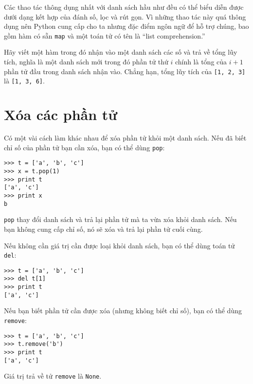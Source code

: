 \documentclass[11pt]{book}
\begin{document}
Các thao tác thông dụng nhất với danh sách hầu như đều có thể 
biểu diễn được dưới dạng kết hợp của đánh số, lọc và rút gọn. 
Vì những thao tác này quá thông dụng nên Python cung cấp cho ta
nhưng đặc điểm ngôn ngữ để hỗ trợ chúng, bao gồm hàm có sẵn 
{\tt map} và một toán tử có tên là ``list comprehension.''


\begin{ex}
\label{cumulative}

Hãy viết một hàm trong đó nhận vào một danh sách các số và trả về
tổng lũy tích, nghĩa là một danh sách mới trong đó phần tử thứ $i$
chính là tổng của $i+1$ phần tử đầu trong danh sách nhận vào.
Chẳng hạn, tổng lũy tích của {\tt [1, 2, 3]} là
{\tt [1, 3, 6]}. 
\end{ex}


\section{Xóa các phần tử}


Có một vài cách làm khác nhau để xóa phần tử khỏi một danh sách.
Nếu đã biết chỉ số của phần tử bạn cần xóa, bạn có thể dùng 
{\tt pop}:


\beforeverb
\begin{verbatim}
>>> t = ['a', 'b', 'c']
>>> x = t.pop(1)
>>> print t
['a', 'c']
>>> print x
b
\end{verbatim}
\afterverb
%
{\tt pop} thay đổi danh sách và trả lại phần tử mà ta vừa xóa 
khỏi danh sách.
Nếu bạn không cung cấp chỉ số, nó sẽ xóa và trả lại phần tử
cuối cùng.

Nếu không cần giá trị cần được loại khỏi danh sách, bạn có thể
dùng toán tử {\tt del}:


\beforeverb
\begin{verbatim}
>>> t = ['a', 'b', 'c']
>>> del t[1]
>>> print t
['a', 'c']
\end{verbatim}
\afterverb
%

Nếu bạn biết phần tử cần được xóa (nhưng không biết chỉ số), bạn có thể
dùng {\tt remove}:


\beforeverb
\begin{verbatim}
>>> t = ['a', 'b', 'c']
>>> t.remove('b')
>>> print t
['a', 'c']
\end{verbatim}
\afterverb
%
Giá trị trả về tử {\tt remove} là {\tt None}.
\end{document}
